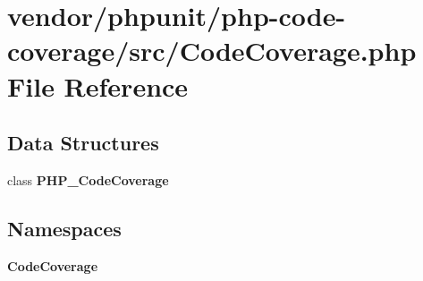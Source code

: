 \section{vendor/phpunit/php-\/code-\/coverage/src/\+Code\+Coverage.php File Reference}
\label{_code_coverage_8php}
\subsection*{Data Structures}
\begin{DoxyCompactItemize}
\item 
class {\bf P\+H\+P\+\_\+\+Code\+Coverage}
\end{DoxyCompactItemize}
\subsection*{Namespaces}
\begin{DoxyCompactItemize}
\item 
 {\bf Code\+Coverage}
\end{DoxyCompactItemize}
